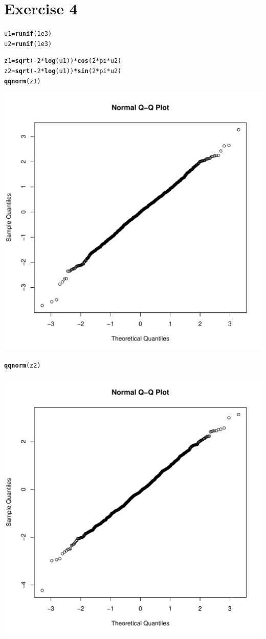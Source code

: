 \documentclass{article}\usepackage[]{graphicx}\usepackage[]{color}
\makeatletter
\newcommand{\hlnum}[1]{\textcolor[rgb]{0.686,0.059,0.569}{#1}}%
\newcommand{\hlopt}[1]{\textcolor[rgb]{0,0,0}{#1}}%
\newcommand{\hlstd}[1]{\textcolor[rgb]{0.345,0.345,0.345}{#1}}%
\newcommand{\hlkwb}[1]{\textcolor[rgb]{0.69,0.353,0.396}{#1}}%
\newcommand{\hlkwd}[1]{\textcolor[rgb]{0.737,0.353,0.396}{\textbf{#1}}}%
\newenvironment{kframe}{%
 \def\at@end@of@kframe{}%
 \ifinner\ifhmode%
  \def\at@end@of@kframe{\end{minipage}}%
  \begin{minipage}{\columnwidth}%
 \fi\fi%
 \def\FrameCommand##1{\hskip\@totalleftmargin \hskip-\fboxsep
 \colorbox{shadecolor}{##1}\hskip-\fboxsep
     \hskip-\linewidth \hskip-\@totalleftmargin \hskip\columnwidth}%
 \MakeFramed {\advance\hsize-\width
   \@totalleftmargin\z@ \linewidth\hsize
   \@setminipage}}%
 {\par\unskip\endMakeFramed%
 \at@end@of@kframe}
\newenvironment{knitrout}{}{} %
\makeatother
\begin{document}
\section*{Exercise 4}
\begin{knitrout}
\color{fgcolor}\begin{kframe}
\begin{alltt}
\hlstd{u1} \hlkwb{=} \hlkwd{runif}\hlstd{(}\hlnum{1e3}\hlstd{)}
\hlstd{u2} \hlkwb{=} \hlkwd{runif}\hlstd{(}\hlnum{1e3}\hlstd{)}

\hlstd{z1} \hlkwb{=} \hlkwd{sqrt}\hlstd{(}\hlopt{-}\hlnum{2}\hlopt{*}\hlkwd{log}\hlstd{(u1))}\hlopt{*}\hlkwd{cos}\hlstd{(}\hlnum{2}\hlopt{*}\hlstd{pi}\hlopt{*}\hlstd{u2)}
\hlstd{z2} \hlkwb{=} \hlkwd{sqrt}\hlstd{(}\hlopt{-}\hlnum{2}\hlopt{*}\hlkwd{log}\hlstd{(u1))}\hlopt{*}\hlkwd{sin}\hlstd{(}\hlnum{2}\hlopt{*}\hlstd{pi}\hlopt{*}\hlstd{u2)}
\hlkwd{qqnorm}\hlstd{(z1)}
\end{alltt}
\end{kframe}
\includegraphics[width=0.50\linewidth]{figure/unnamed-chunk-4-1} 
\begin{kframe}\begin{alltt}
\hlkwd{qqnorm}\hlstd{(z2)}
\end{alltt}
\end{kframe}
\includegraphics[width=0.50\linewidth]{figure/unnamed-chunk-4-2} 

\end{knitrout}
\end{document}
